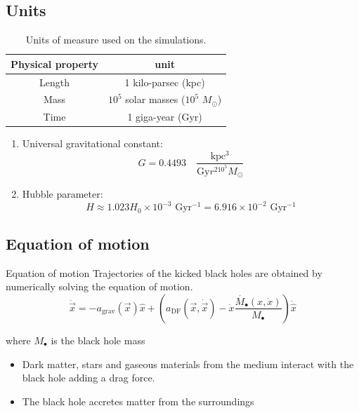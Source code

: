 \documentclass{beamer}
\newcommand{\sm}[0]{$M_\odot$}
\begin{document}
\subsection{Units}


\begin{frame}{}
	\begin{table}[h]
		\centering
		\caption{Units of measure used on the simulations.}
		\label{tb: units}
		\begin{tabular}{c|c}
			\hline
			\textbf{Physical property} & \textbf{unit} \\
			\hline
			Length & 1 kilo-parsec (kpc) \\
			Mass & $10^5$ solar masses ($10^5$ \sm) \\
			Time & 1 giga-year (Gyr) \\
			\hline
		\end{tabular}
	\end{table}
	\begin{enumerate}
		\item Universal gravitational constant:
		\begin{equation}
			G = 0.4493 \quad \dfrac{\text{kpc$^3$}}{\text{Gy$r^210^5$\sm}}
		\end{equation}
		\item Hubble parameter:
			\begin{equation}
			H \approx 1.023 H_0 \times10^{-3} \text{ Gyr$^{-1}$} = 6.916\times10^{-2}\text{ Gyr$^{-1}$}
			\end{equation}
	\end{enumerate}
\end{frame}


\subsection{Equation of motion}
	\begin{frame}{Equation of motion}
	Trajectories of the kicked black holes are obtained by numerically solving the equation of motion.
	\begin{equation}\label{eq: equationMotion}
		\ddot{\vec{x}} = -a_\text{grav}(\vec{x})\hat{x} + \left(a_\text{DF}(\vec{x}, \dot{\vec{x}})-\dot{x}\dfrac{\dot{M_\bullet}(x, \dot{x})}{M_\bullet}\right)\dot{\hat{x}} 
	\end{equation}
	
	where $M_\bullet$ is the black hole mass
	
	\begin{itemize}
		\item Dark matter, stars and gaseous materials from the medium interact with the black hole adding a drag force.
		\item The black hole accretes matter from the surroundings
	\end{itemize}
\end{frame}
\end{document}
